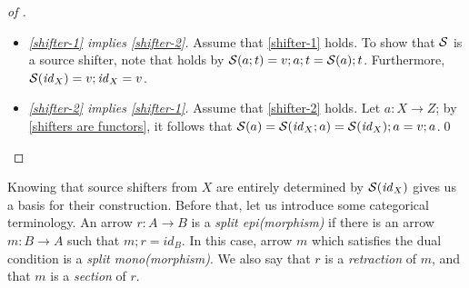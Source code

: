 %
\begin{fullorname}
\begin{proof}[of ]
\begin{itemize}[topsep=\smallskipamount]
\item \emph{\ref{shifter-1} implies \ref{shifter-2}.}
%
Assume that \ref{shifter-1} holds. To show that  $\mathcal{S}$ is a source shifter, note that   holds by $\mathcal{S}(a;t)=v;a;t=\mathcal{S}(a);t$. Furthermore, $\mathcal{S}(\mathit{id}_X)=v;\mathit{id}_X=v$.

\item \emph{\ref{shifter-2} implies \ref{shifter-1}.}
%
Assume that \ref{shifter-2} holds. Let $a:X\to Z$; by \eqref{shifters are functors}, it follows that $\mathcal{S}(a)=\mathcal{S}(\mathit{id}_X;a)=\mathcal{S}(\mathit{id}_X);a=v;a$.\qed
\end{itemize}
\end{proof}
\end{fullorname}
%
Knowing that source shifters from $X$ are entirely determined by $\mathcal{S}(\mathit{id}_X)$ gives us a basis for their construction. Before that, let us introduce some categorical terminology. An arrow $r: A \to B$ is a \emph{split epi(morphism)} if there is an arrow $m:B\to A$ such that $m;r = id_B$. In this case, arrow $m$ which satisfies the dual condition is a 
\emph{split mono(morphism)}. We also say that $r$ is a \emph{retraction} of $m$, and that $m$ is a \emph{section} of $r$.

